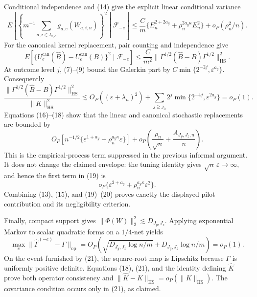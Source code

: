 Conditional independence and (14) give the explicit linear conditional variance
\[
E\!\left[\left\{m^{-1}\sum_{a,i\in I_{a,e}}g_{a,e}(W_{a,i,n})\right\}^2\middle|\mathscr F_{-e}\right]
\le\frac C m\{E_n^{2+2a_y}+\rho_n^{2a_y\kappa}E_n^2\}+o_P(\rho_n^2/n). \tag{16}
\]
For the canonical kernel replacement, pair counting and independence give
\[
E[\{U_e^{\mathrm{can}}(\widehat B)-U_e^{\mathrm{can}}(B)\}^2\mid\mathscr F_{-e}]
\le\frac C{m^2}\|\Gamma^{1/2}(\widehat B-B)\Gamma^{1/2}\|_{\mathrm{HS}}^2. \tag{17}
\]
At outcome level \(j\), (7)--(9) bound the Galerkin part by \(C\min\{2^{-2j},\varepsilon^{a_y}\}\). Consequently
\[
\frac{\|\Gamma^{1/2}(\widehat B-B)\Gamma^{1/2}\|_{\mathrm{HS}}^2}{\|K\|_{\mathrm{HS}}^2}
\lesssim O_P((\varepsilon+\lambda_n)^2)
+\sum_{j\ge j_0}2^j\min\{2^{-4j},\varepsilon^{2a_y}\}=o_P(1).       \tag{18}
\]
Equations (16)--(18) show that the linear and canonical stochastic replacements are bounded by
\[
O_P\!\left[n^{-1/2}\{\varepsilon^{1+a_y}+\rho_n^{a_y\kappa}\varepsilon\}\right]
+o_P\!\left(\frac{\rho_n}{\sqrt n}+\frac{A_{J_y,J_z,n}}n\right).     \tag{19}
\]
This is the empirical-process term suppressed in the previous informal argument. It does not change the claimed envelope: the tuning identity gives \(\sqrt n\,\varepsilon\to\infty\), and hence the first term in (19) is
\[
o_P\{\varepsilon^{2+a_y}+\rho_n^{a_y\kappa}\varepsilon^2\}.         \tag{20}
\]
Combining (13), (15), and (19)--(20) proves exactly the displayed pilot contribution and its negligibility criterion.

Finally, compact support gives \(\|\Phi(W)\|_2^2\lesssim D_{J_y,J_z}\). Applying exponential Markov to scalar quadratic forms on a \(1/4\)-net yields
\[
\max_e\|\widehat\Gamma^{(-e)}-\Gamma\|_{\mathrm{op}}
=O_P\!\left(\sqrt{D_{J_y,J_z}\log n/m}+D_{J_y,J_z}\log n/m\right)=o_P(1). \tag{21}
\]
On the event furnished by (21), the square-root map is Lipschitz because \(\Gamma\) is uniformly positive definite. Equations (18), (21), and the identity defining \(\widehat K\) prove both operator consistency and \(\|\widehat K-K\|_{\mathrm{HS}}=o_P(\|K\|_{\mathrm{HS}})\). The covariance condition occurs only in (21), as claimed.
